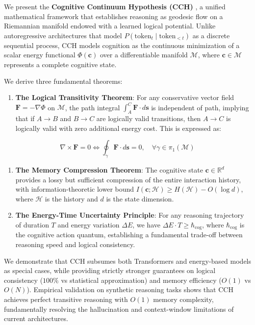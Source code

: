 \documentclass[
  11pt,
  a4paper,
]{article}
\providecommand{\tightlist}{%
  \setlength{\itemsep}{0pt}\setlength{\parskip}{0pt}}
\begin{document}
We present the \textbf{Cognitive Continuum Hypothesis (CCH)} , a unified
mathematical framework that establishes reasoning as geodesic flow on a
Riemannian manifold endowed with a learned logical potential. Unlike
autoregressive architectures that model
\(P(\text{token}_t \mid \text{token}_{<t})\) as a discrete sequential
process, CCH models cognition as the continuous minimization of a scalar
energy functional \(\Phi(\mathbf{c})\) over a differentiable manifold
\(\mathcal{M}\), where \(\mathbf{c} \in \mathcal{M}\) represents a
complete cognitive state.

We derive three fundamental theorems:

\begin{enumerate}
\def\labelenumi{\arabic{enumi}.}
\tightlist
\item
  \textbf{The Logical Transitivity Theorem}: For any conservative vector
  field \(\mathbf{F} = -\nabla\Phi\) on \(\mathcal{M}\), the path
  integral \(\int_A^C \mathbf{F} \cdot d\mathbf{s}\) is independent of
  path, implying that if \(A \to B\) and \(B \to C\) are logically valid
  transitions, then \(A \to C\) is logically valid with zero additional
  energy cost. This is expressed as:
\end{enumerate}

\[\nabla \times \mathbf{F} = 0 \iff \oint_{\gamma} \mathbf{F} \cdot d\mathbf{s} = 0, \quad \forall \gamma \in \pi_1(\mathcal{M})\]

\begin{enumerate}
\def\labelenumi{\arabic{enumi}.}
\setcounter{enumi}{1}
\item
  \textbf{The Memory Compression Theorem}: The cognitive state
  \(\mathbf{c} \in \mathbb{R}^d\) provides a lossy but sufficient
  compression of the entire interaction history, with
  information-theoretic lower bound
  \(I(\mathbf{c}; \mathcal{H}) \geq H(\mathcal{H}) - O(\log d)\), where
  \(\mathcal{H}\) is the history and \(d\) is the state dimension.
\item
  \textbf{The Energy-Time Uncertainty Principle}: For any reasoning
  trajectory of duration \(T\) and energy variation \(\Delta E\), we
  have \(\Delta E \cdot T \geq \hbar_{\text{cog}}\), where
  \(\hbar_{\text{cog}}\) is the cognitive action quantum, establishing a
  fundamental trade-off between reasoning speed and logical consistency.
\end{enumerate}

We demonstrate that CCH subsumes both Transformers and energy-based
models as special cases, while providing strictly stronger guarantees on
logical consistency (\(100\%\) vs statistical approximation) and memory
efficiency (\(O(1)\) vs \(O(N)\)). Empirical validation on synthetic
reasoning tasks shows that CCH achieves perfect transitive reasoning
with \(O(1)\) memory complexity, fundamentally resolving the
hallucination and context-window limitations of current architectures.
\end{document}
